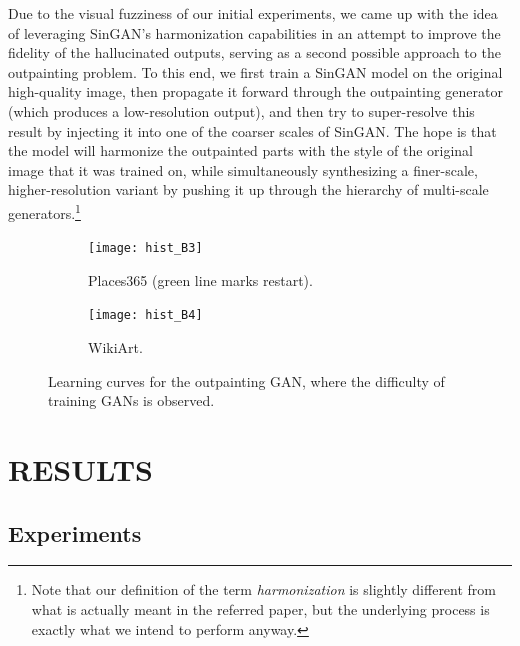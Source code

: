 \documentclass[twocolumn,showpacs,%
  nofootinbib,aps,superscriptaddress,%
  eqsecnum,prd,notitlepage,showkeys,10pt]{revtex4-1}
\begin{document}
\hspace{\parindent} Due to the visual fuzziness of our initial experiments, we came up with the idea of leveraging SinGAN's harmonization capabilities in an attempt to improve the fidelity of the hallucinated outputs, serving as a second possible approach to the outpainting problem. To this end, we first train a SinGAN model on the original high-quality image, then propagate it forward through the outpainting generator (which produces a low-resolution output), and then try to super-resolve this result by injecting it into one of the coarser scales of SinGAN. The hope is that the model will harmonize the outpainted parts with the style of the original image that it was trained on, while simultaneously synthesizing a finer-scale, higher-resolution variant by pushing it up through the hierarchy of multi-scale generators.\footnote{Note that our definition of the term \textit{harmonization} is slightly different from what is actually meant in the referred paper, but the underlying process is exactly what we intend to perform anyway.}

\begin{figure}[tp]
  \centering
  \begin{subfigure}[b]{\columnwidth}
      \centering
      \texttt{[image: hist\_B3]}
      \caption{Places365 (green line marks restart).}
      \vspace{0.2cm}
  \end{subfigure}
  \begin{subfigure}[b]{\columnwidth}
      \centering
      \texttt{[image: hist\_B4]}
      \caption{WikiArt.}
  \end{subfigure}
  \caption{Learning curves for the outpainting GAN, where the difficulty of training GANs is observed.}
  \label{fig:learn_curves}
\end{figure}

\section{RESULTS}

\subsection{Experiments}
\end{document}
